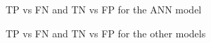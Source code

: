 \documentclass{llncs}
\begin{document}
\begin{figure}[htbp]
\hspace{-1.2cm}
    \caption{\small{TP vs FN and TN vs FP for the ANN model}}
    \label{fig:abc}
\end{figure}
\begin{figure}[htbp]
\hspace{-1.5cm}
    \caption{\small{TP vs FN and TN vs FP for the other models}}
    \label{fig:abc}
\end{figure}
\end{document}
